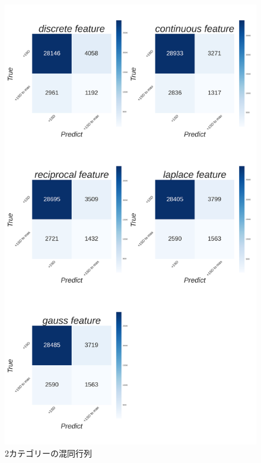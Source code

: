 \documentclass[12pt,a4paper,oneside]{jsbook}
\theoremstyle{plain}
\begin{document}
\begin{figure}
  \centering %
  \includegraphics[scale=0.23]{./non-crime-val-figure/non_crime_val_two_cm.png}
  \caption{2カテゴリーの混同行列}
  \label{fig:nc-val-2cm}
\end{figure}
\end{document}
